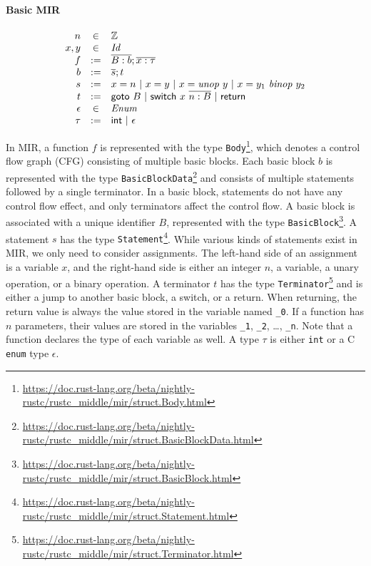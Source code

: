 \documentclass{article}[10pt]
\newcommand{\C}[1]{{\small\tt #1}}
\begin{document}
\title{}
\author{}
\date{}

\paragraph{Basic MIR}

\[
  \begin{array}{@{}rcl@{}}
    n &\in& \mathbb{Z} \\
    x,y &\in& \mathit{Id} \\
    f &:=& \overline{B:b};\overline{x:\tau} \\
    b &:=& \overline{s}; t \\
    s &:=& x=n\ |\ x=y\ |\ x={\it unop}\ y\ |\ x=y_1\ {\it binop}\ y_2 \\
    t &:=& {\sf goto}\ B\ |\ {\sf switch}\ x\ \overline{n:B}\ |\ {\sf return} \\
    \epsilon &\in& \mathit{Enum} \\
    \tau &:=& {\sf int}\ |\ \epsilon \\
  \end{array}
\]

In MIR, a function $f$ is represented with the type
\C{Body}\footnote{\url{https://doc.rust-lang.org/beta/nightly-rustc/rustc\_middle/mir/struct.Body.html}},
which denotes a control flow graph (CFG) consisting of multiple basic blocks.
%
Each basic block $b$ is represented with the type
\C{BasicBlockData}\footnote{\url{https://doc.rust-lang.org/beta/nightly-rustc/rustc\_middle/mir/struct.BasicBlockData.html}}
and consists of multiple statements followed by a single terminator.
%
In a basic block, statements do not have any control flow effect, and only
terminators affect the control flow.
%
A basic block is associated with a unique identifier $B$, represented with the
type
\C{BasicBlock}\footnote{\url{https://doc.rust-lang.org/beta/nightly-rustc/rustc\_middle/mir/struct.BasicBlock.html}}.
%
A statement $s$ has the type
\C{Statement}\footnote{\url{https://doc.rust-lang.org/beta/nightly-rustc/rustc_middle/mir/struct.Statement.html}}.
%
While various kinds of statements exist in MIR, we only need to consider
assignments.
%
The left-hand side of an assignment is a variable $x$, and the right-hand side
is either an integer $n$, a variable, a unary operation, or a binary operation.
%
A terminator $t$ has the type
\C{Terminator}\footnote{\url{https://doc.rust-lang.org/beta/nightly-rustc/rustc\_middle/mir/struct.Terminator.html}}
and is either a jump to another basic block, a switch, or a return.
%
When returning, the return value is always the value stored in the variable
named \C{\_0}.
%
If a function has $n$ parameters, their values are stored in the variables
\C{\_1}, \C{\_2}, \ldots, \C{\_n}.
%
Note that a function declares the type of each variable as well.
%
A type $\tau$ is either \C{int} or a C \C{enum} type $\epsilon$.
\end{document}
